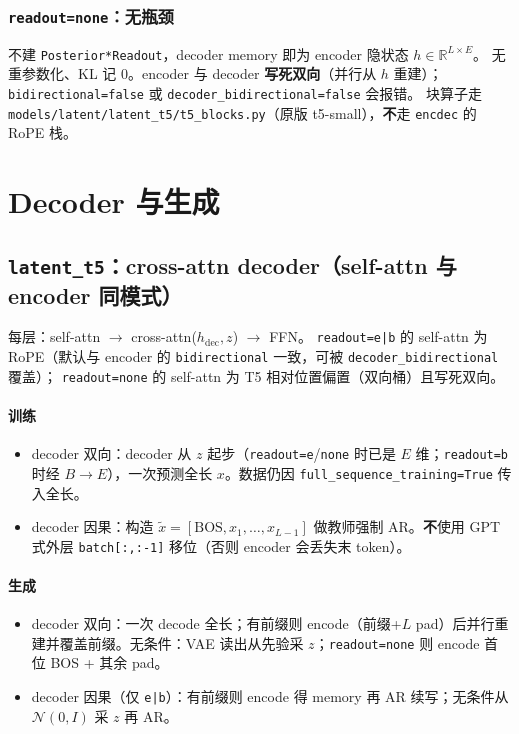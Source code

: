 \documentclass[UTF8,a4paper,11pt]{ctexart}
\begin{document}
\subsubsection{\texttt{readout=none}：无瓶颈}

不建 \texttt{Posterior*Readout}，decoder memory 即为 encoder 隐状态 $h\in\mathbb{R}^{L\times E}$。
无重参数化、KL 记 0。encoder 与 decoder \textbf{写死双向}（并行从 $h$ 重建）；\texttt{bidirectional=false} 或 \texttt{decoder\_bidirectional=false} 会报错。
块算子走 \texttt{models/latent/latent\_t5/t5\_blocks.py}（原版 t5-small），\textbf{不}走 \texttt{encdec} 的 RoPE 栈。

\section{Decoder 与生成}

\subsection{\texttt{latent\_t5}：cross-attn decoder（self-attn 与 encoder 同模式）}

每层：self-attn $\to$ cross-attn($h_{\mathrm{dec}}, z$) $\to$ FFN。
\texttt{readout=e|b} 的 self-attn 为 RoPE（默认与 encoder 的 \texttt{bidirectional} 一致，可被 \texttt{decoder\_bidirectional} 覆盖）；
\texttt{readout=none} 的 self-attn 为 T5 相对位置偏置（双向桶）且写死双向。

\paragraph{训练}
\begin{itemize}
  \item decoder 双向：decoder 从 $z$ 起步（\texttt{readout=e}/\texttt{none} 时已是 $E$ 维；\texttt{readout=b} 时经 $B\to E$），一次预测全长 $x$。数据仍因 \texttt{full\_sequence\_training=True} 传入全长。
  \item decoder 因果：构造 $\tilde{x} = [\mathrm{BOS}, x_1,\ldots,x_{L-1}]$ 做教师强制 AR。\textbf{不}使用 GPT 式外层 \texttt{batch[:,:-1]} 移位（否则 encoder 会丢失末 token）。
\end{itemize}

\paragraph{生成}
\begin{itemize}
  \item decoder 双向：一次 decode 全长；有前缀则 encode（前缀+$L$ pad）后并行重建并覆盖前缀。无条件：VAE 读出从先验采 $z$；\texttt{readout=none} 则 encode 首位 BOS + 其余 pad。
  \item decoder 因果（仅 \texttt{e|b}）：有前缀则 encode 得 memory 再 AR 续写；无条件从 $\mathcal{N}(0,I)$ 采 $z$ 再 AR。
\end{itemize}
\end{document}
